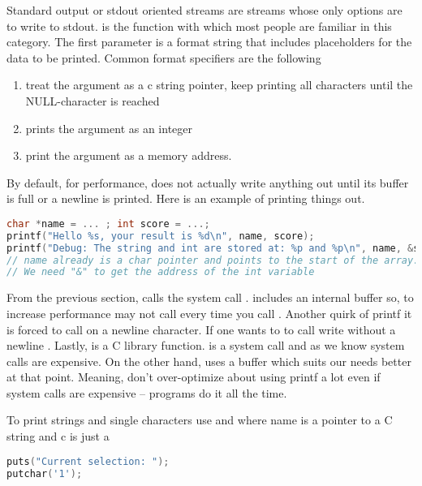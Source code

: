 Standard output or stdout oriented streams are streams whose only options are to write to stdout.
 is the function with which most people are familiar in this category.
The first parameter is a format string that includes placeholders for the data to be printed.
Common format specifiers are the following
\begin{enumerate}
\item {} treat the argument as a c string pointer, keep printing all characters until the NULL-character is reached
\item {} prints the argument as an integer
  \item {} print the argument as a memory address.
    \end{enumerate}
By default, for performance,  does not actually write anything out until its buffer is full or a newline is printed.
Here is an example of printing things out.

\begin{lstlisting}[language=C]
char *name = ... ; int score = ...;
printf("Hello %s, your result is %d\n", name, score);
printf("Debug: The string and int are stored at: %p and %p\n", name, &score );
// name already is a char pointer and points to the start of the array.
// We need "&" to get the address of the int variable
\end{lstlisting}

From the previous section,
 calls the system call .
 includes an internal buffer so, to increase performance  may not call  every time you call .
Another quirk of printf it is forced to call  on a newline character.
If one wants to  to call write without a newline .
Lastly,  is a C library function.
 is a system call and as we know system calls are expensive. On the other hand,  uses a buffer which suits our needs better at that point.
Meaning, don't over-optimize about using printf a lot even if system calls are expensive -- programs do it all the time.

To print strings and single characters use  and  where name is a pointer to a C string and c is just a 

\begin{lstlisting}[language=C]
puts("Current selection: ");
putchar('1');
\end{lstlisting}

